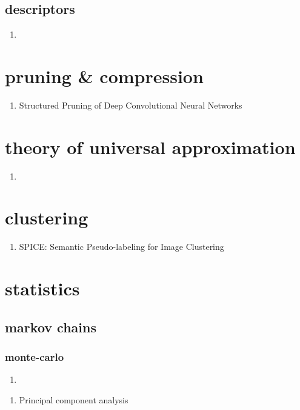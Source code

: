 \documentclass[acmlarge]{acmart}
\begin{document}
	\subsection{descriptors}
	\begin{enumerate}
		\item
	\end{enumerate}
\begin{enumerate}
\end{enumerate}
\section{pruning & compression}
\begin{enumerate}
	\item Structured Pruning of Deep Convolutional Neural Networks \cite{Anwar2017StructuredPO} 

\end{enumerate}
\section{theory of universal approximation}
\begin{enumerate}
	\item
\end{enumerate}
\section{clustering}
\begin{enumerate}
	\item SPICE: Semantic Pseudo-labeling for Image Clustering \cite{Niu2021SPICESP} 

\end{enumerate}
\section{statistics}
	\subsection{markov chains}
		\subsubsection{monte-carlo}
		\begin{enumerate}
			\item
		\end{enumerate}
	\begin{enumerate}
	\end{enumerate}
\begin{enumerate}
	\item Principal component analysis \cite{Wold1987PrincipalCA} 

\end{enumerate}
\end{document}
